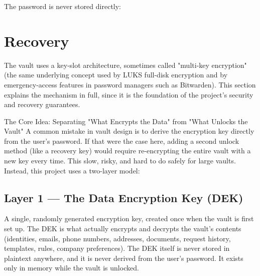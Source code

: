 The password is never stored directly:

\break
\begin{center}
\end{center}



\section{Recovery}
The vault uses a key-slot architecture, sometimes called "multi-key encryption" (the same underlying concept used by LUKS full-disk encryption and by emergency-access features in password managers such as Bitwarden). This section explains the mechanism in full, since it is the foundation of the project's security and recovery guarantees.

The Core Idea: Separating "What Encrypts the Data" from "What Unlocks the Vault"
A common mistake in vault design is to derive the encryption key directly from the user's password. If that were the case here, adding a second unlock method (like a recovery key) would require re-encrypting the entire vault with a new key every time. This slow, risky, and hard to do safely for large vaults.
Instead, this project uses a two-layer model:

\subsection{Layer 1 — The Data Encryption Key (DEK)}
A single, randomly generated encryption key, created once when the vault is first set up.
The DEK is what actually encrypts and decrypts the vault's contents (identities, emails, phone numbers, addresses, documents, request history, templates, rules, company preferences).
The DEK itself is never stored in plaintext anywhere, and it is never derived from the user's password. It exists only in memory while the vault is unlocked.

